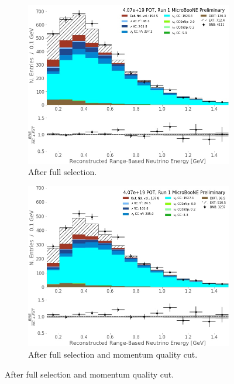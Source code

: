 \begin{figure}[] 
\begin{center}
    \begin{subfigure}[b]{0.45\textwidth}
    \centering
    \includegraphics[width=1.00\textwidth]{NuMuCCsel/Images/Ryan/Run1_recoErange_fullSel.jpg}
    \caption{\label{fig:NuMUCCsel:ryan:noPQuality} After full selection.}
    \end{subfigure}
    \begin{subfigure}[b]{0.45\textwidth}
    \centering
    \includegraphics[width=1.00\textwidth]{NuMuCCsel/Images/Ryan/Run1_recoErange_FullSel_pquality.jpg}
    \caption{\label{fig:NuMUCCsel:ryan:withPQuality} After full selection and momentum quality cut.}

\end{subfigure}
\end{center}
\end{figure}
